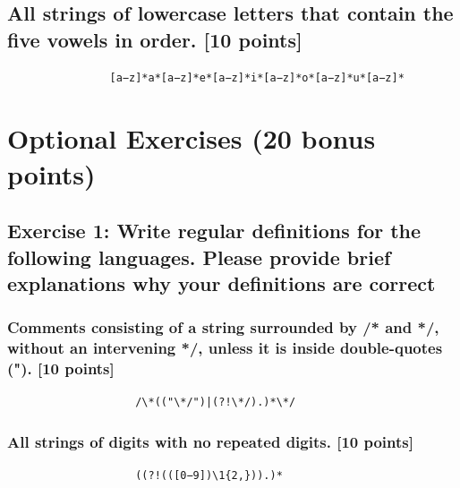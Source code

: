 \documentclass{article}
\begin{document}
        \subsection{All strings of lowercase letters that contain the five vowels in order. [10 points]}
            \begin{lstlisting}
                [a−z]*a*[a−z]*e*[a−z]*i*[a−z]*o*[a−z]*u*[a−z]*                
            \end{lstlisting}
    \section{Optional Exercises (20 bonus points)}
        \subsection{Exercise 1: Write regular definitions for the following languages. Please provide brief
        explanations why your definitions are correct}
            \subsubsection{Comments consisting of a string surrounded by /* and */, without an intervening */, unless it is
            inside double-quotes ("). [10 points]}
                \begin{lstlisting}
                    /\*(("\*/")|(?!\*/).)*\*/
                \end{lstlisting}
            \subsubsection{All strings of digits with no repeated digits. [10 points]}
                \begin{lstlisting}
                    ((?!(([0−9])\1{2,})).)*
                \end{lstlisting}
\end{document}
